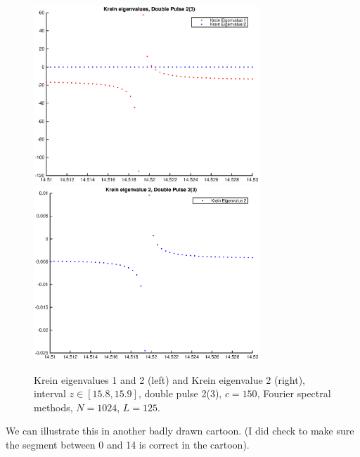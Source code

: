 \documentclass[12pt]{article}
\begin{document}
\begin{figure}[H]
	\includegraphics[width=8.5cm]{1500F_dp2_125_kreinzoom5.eps}
	\includegraphics[width=8.5cm]{1500F_dp2_125_kreinzoom6.eps}
	\caption{Krein eigenvalues 1 and 2 (left) and Krein eigenvalue 2 (right), interval $z \in [15.8, 15.9]$, double pulse 2(3), $c = 150$, Fourier spectral methods, $N = 1024$, $L = 125$. }
\end{figure}

We can illustrate this in another badly drawn cartoon. (I did check to make sure the segment between 0 and 14 is correct in the cartoon).
\end{document}
